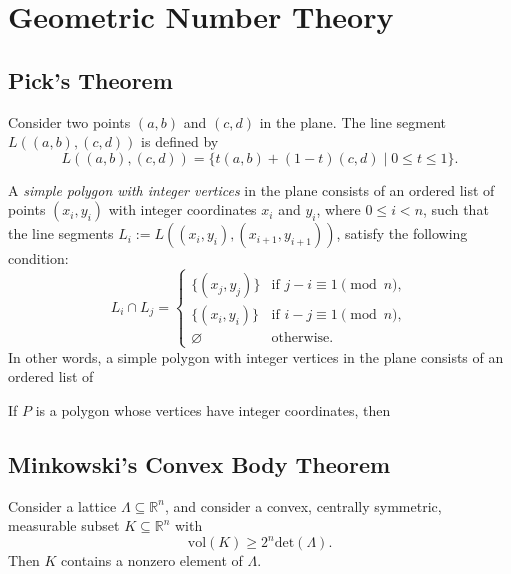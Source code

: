 \chapter{Geometric Number Theory}

\section{Pick's Theorem}

\begin{definition}
  Consider two points $(a,b)$ and $(c,d)$ in the plane. The line segment $L((a,b),(c,d))$ is defined by
  \begin{equation*}
    L((a,b),(c,d))= \{t(a,b)+(1-t)(c,d)\mid 0\leq t\leq 1\}.
  \end{equation*}
\end{definition}

\begin{definition}
  A \emph{simple polygon with integer vertices} in the plane consists of an ordered list of points $(x_i,y_i)$  with integer coordinates $x_i$ and $y_i$, where $0\leq i < n$, such that the line segments $L_i:=L((x_i,y_i),(x_{i+1},y_{i+1}))$, satisfy the following condition:
  \begin{equation*}
    L_i\cap L_j=
    \begin{cases}
      \{(x_j,y_j)\} & \text{if $j-i\equiv 1\pmod{n}$}, \\
      \{(x_i,y_i)\} & \text{if $i-j\equiv 1\pmod{n}$}, \\
      \varnothing & \text{otherwise.}
    \end{cases}
  \end{equation*}
  In other words, a simple polygon with integer vertices in the plane consists of an ordered list of 
\end{definition}

\begin{theorem}
  If $P$ is a polygon whose vertices have integer coordinates, then
  
\end{theorem}

\section{Minkowski's Convex Body Theorem}

\begin{theorem}
  Consider a lattice $\Lambda\subseteq \mathbb{R}^n$, and consider a convex, centrally symmetric, measurable subset $K\subseteq \mathbb{R}^n$ with
  \begin{equation*}
    \mathrm{vol}(K)\geq 2^n\mathrm{det}(\Lambda).
  \end{equation*}
  Then $K$ contains a nonzero element of $\Lambda$.
\end{theorem}

